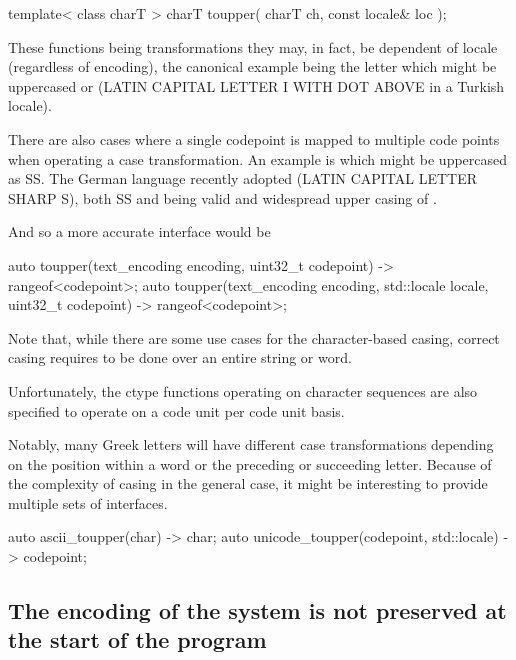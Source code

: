 \documentclass{wg21}
\newcommand{\UnicodeLetter}[1]{\textbf{\textcolor{BrickRed}{\Large\tcode{#1}}}}
\begin{document}
\begin{codeblock}
template< class charT >
charT toupper( charT ch, const locale& loc );
\end{codeblock}

These functions being transformations they may, in fact, be dependent of locale (regardless of encoding),
the canonical example being the letter \UnicodeLetter{i} which might be uppercased \UnicodeLetter{I} or \UnicodeLetter{İ} (LATIN CAPITAL LETTER I WITH DOT ABOVE in a Turkish locale).

There are also cases where a single codepoint is mapped to multiple code points when operating a case transformation.
An example is \UnicodeLetter{ß} which might be uppercased as SS. The German language recently adopted \UnicodeLetter{ẞ} (LATIN CAPITAL LETTER SHARP S), both SS and \UnicodeLetter{ẞ} being valid and widespread upper casing of \UnicodeLetter{ß}.

And so a more accurate interface would be

\begin{codeblock}
auto toupper(text_encoding encoding, 
uint32_t codepoint) -> rangeof<codepoint>;
auto toupper(text_encoding encoding, std::locale locale, uint32_t codepoint) -> rangeof<codepoint>;
\end{codeblock}


Note that, while there are some use cases for the character-based casing, correct casing requires to be done over an entire string or word.

Unfortunately, the ctype functions operating on character sequences are also specified to operate on a code unit per code unit basis.  

Notably, many Greek letters will have different case transformations depending on the position within a word or the preceding or succeeding letter.
Because of the complexity of casing in the general case, it might be interesting to provide multiple sets of interfaces.

\begin{codeblock}

auto ascii_toupper(char) -> char;
auto unicode_toupper(codepoint, std::locale) -> codepoint;

\end{codeblock}

\subsection{The encoding of the system is not preserved at the start of the program}
\end{document}
